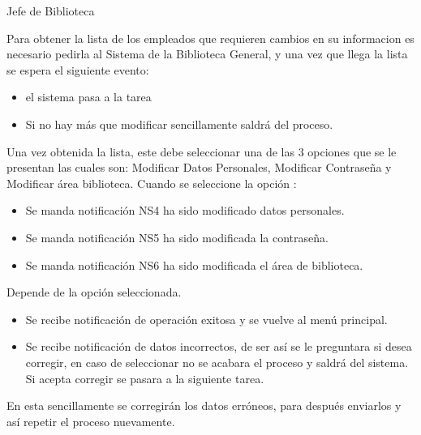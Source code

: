 \begin{PDescripcion}

  \Ppaso Jefe de Biblioteca

    \begin{enumerate}

      \Ppaso[\itarea] Para obtener la lista de los empleados que requieren cambios en su informacion es necesario pedirla al Sistema de la Biblioteca General, y una vez que llega la lista se espera el siguiente evento:
      \begin{itemize}
      	\item {} el sistema pasa a la tarea 
		\item Si no hay más que modificar sencillamente saldrá del proceso.
      \end{itemize}

	\Ppaso[\itarea]  Una vez obtenida la lista, este debe seleccionar una de las 3 opciones que se le presentan las cuales son:
Modificar Datos Personales, Modificar Contraseña y Modificar área
biblioteca. 
Cuando se seleccione la opción :
\begin{itemize}
\item Se manda notificación NS4 ha sido modificado datos personales.
\item Se manda notificación NS5 ha sido modificada la contraseña.
\item Se manda notificación NS6 ha sido modificada el área de biblioteca.
\end{itemize}

Depende de la opción seleccionada.
\begin{itemize}
\item Se recibe notificación de operación exitosa y se vuelve al menú
principal.
\item Se recibe notificación de datos incorrectos, de ser así se le
preguntara si desea corregir, en caso de seleccionar no se acabara
el proceso y saldrá del sistema. Si acepta corregir se pasara a la
siguiente tarea.
\end{itemize}

\Ppaso[\itarea]  En esta sencillamente se corregirán los datos erróneos, para después enviarlos y así repetir el proceso nuevamente.
	\end{enumerate}
    

\end{PDescripcion}
